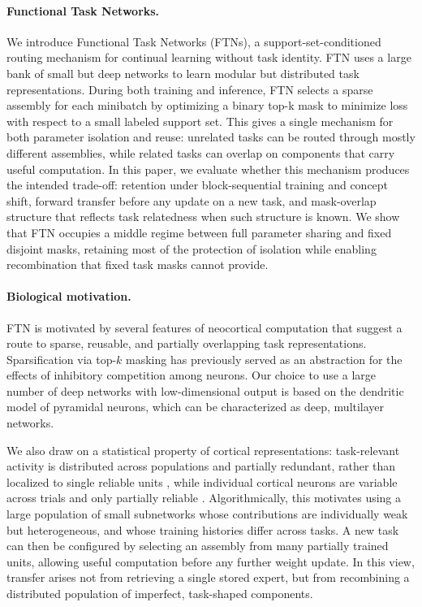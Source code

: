 \documentclass[11pt]{article}
\begin{document}
\paragraph{Functional Task Networks.}
We introduce Functional Task Networks (FTNs), a support-set-conditioned routing mechanism for continual learning without task identity. FTN uses a large bank of small but deep networks to learn modular but distributed task representations. During both training and inference, FTN selects a sparse assembly for each minibatch by optimizing a binary top-k mask to minimize loss with respect to a small labeled support set. This gives a single mechanism for both parameter isolation and reuse: unrelated tasks can be routed through mostly different assemblies, while related tasks can overlap on components that carry useful computation. In this paper, we evaluate whether this mechanism produces the intended trade-off: retention under block-sequential training and concept shift, forward transfer before any update on a new task, and mask-overlap structure that reflects task relatedness when such structure is known. We show that FTN occupies a middle regime between full parameter sharing and fixed disjoint masks, retaining most of the protection of isolation while enabling recombination that fixed task masks cannot provide.

\paragraph{Biological motivation.}
FTN is motivated by several features of neocortical computation that suggest a route to sparse, reusable, and partially overlapping task representations. Sparsification via top-$k$ masking has previously served as an abstraction for the effects of inhibitory competition among neurons\citep{yang2019task,cichon2015branch,mongillo2018inhibitory,rolls2010attractor,khona2022attractor,amari1977dynamics,maass2000computational,douglas2004neuronal}. Our choice to use a large number of deep networks with low-dimensional output is based on the dendritic model of pyramidal neurons, which can be characterized as deep, multilayer networks\citep{poirazi2003pyramidal,poirazi2020illuminating,beniaguev2021single}.

We also draw on a statistical property of cortical representations: task-relevant activity is distributed across populations and partially redundant, rather than localized to single reliable units \citep{georgopoulos1986neuronal,averbeck2006neural,cohen2011measuring}, while individual cortical neurons are variable across trials and only partially reliable \citep{tolhurst1983statistical,softky1993highly,shadlen1998variable,faisal2008noise,churchland2010stimulus,goris2014partitioning}. Algorithmically, this motivates using a large population of small subnetworks whose contributions are individually weak but heterogeneous, and whose training histories differ across tasks. A new task can then be configured by selecting an assembly from many partially trained units, allowing useful computation before any further weight update. In this view, transfer arises not from retrieving a single stored expert, but from recombining a distributed population of imperfect, task-shaped components.
\end{document}

